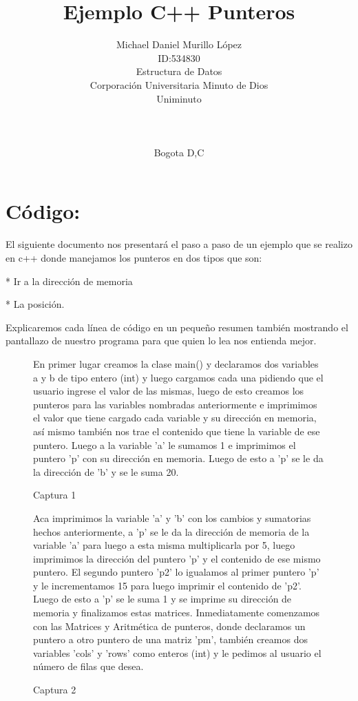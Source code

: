 \documentclass{article}
\title{Ejemplo  C++ Punteros}
\author{Michael Daniel Murillo López\\
\small ID:534830\\
\small Estructura de Datos\\
\small Corporación Universitaria Minuto de Dios    \\
\small  Uniminuto\\
\small \\
\small \\
\small \\
\small Bogota D,C\\
}
\begin{document}
\maketitle

\section{Código:}

\LARGE El siguiente documento nos presentará el paso a paso de un ejemplo que se realizo en c++ donde manejamos los punteros en dos tipos que son:

* Ir a la dirección de memoria 


* La posición. 


Explicaremos cada línea de código en un pequeño resumen también mostrando el pantallazo de nuestro programa para que quien lo lea nos entienda mejor.

\begin{figure}
  \centering
  
   
En primer lugar creamos la clase main() y declaramos dos variables a y b de tipo entero (int) y luego cargamos cada una pidiendo que el usuario ingrese el valor de las mismas, luego de esto creamos los punteros para las variables nombradas anteriormente e imprimimos el valor que tiene cargado cada variable y su dirección en memoria, así mismo también nos trae el contenido que tiene la variable de ese puntero. Luego a la variable 'a' le sumamos 1 e imprimimos el puntero 'p' con su dirección en memoria. Luego de esto a 'p' se le da la dirección de 'b' y se le suma 20.
   
  \caption{Captura 1}
  \label{fig:ejemplo}
\end{figure}


\begin{figure}
  \centering
  
Aca imprimimos la variable 'a' y 'b' con los cambios y sumatorias hechos anteriormente, a 'p' se le da la dirección de memoria de la variable 'a' para luego a esta misma multiplicarla por 5, luego imprimimos la dirección del puntero 'p' y el contenido de ese mismo puntero. El segundo puntero 'p2' lo igualamos al primer puntero 'p' y le incrementamos 15 para luego imprimir el contenido de 'p2'. Luego de esto a 'p' se le suma 1 y se imprime su dirección de memoria y finalizamos estas matrices. Inmediatamente comenzamos con las Matrices y Aritmética de punteros, donde declaramos un puntero a otro puntero de una matriz 'pm', también creamos dos variables 'cols' y 'rows' como enteros (int) y le pedimos al usuario el número de filas que desea.
   
  \caption{Captura 2}
  \label{fig:ejemplo}
\end{figure}
\end{document}
